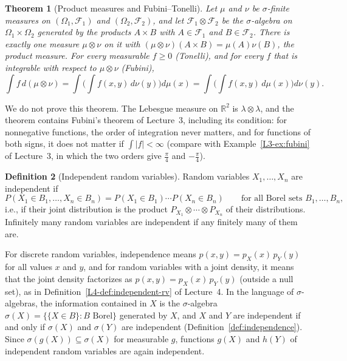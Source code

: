 \documentclass[11pt]{article}
\theoremstyle{definition}
\newtheorem{definition}{Definition}[section]
\theoremstyle{plain}
\newtheorem{theorem}[definition]{Theorem}
\theoremstyle{remark}
\begin{document}
\begin{theorem}[Product measures and Fubini--Tonelli]\label{thm:fubini-tonelli}
    Let $\mu$ and $\nu$ be $\sigma$-finite measures on $(\Omega_1, \mathcal{F}_1)$ and $(\Omega_2, \mathcal{F}_2)$, and let $\mathcal{F}_1 \otimes \mathcal{F}_2$ be the $\sigma$-algebra on $\Omega_1 \times \Omega_2$ generated by the products $A \times B$ with $A \in \mathcal{F}_1$ and $B \in \mathcal{F}_2$. There is exactly one measure $\mu \otimes \nu$ on it with $(\mu \otimes \nu)(A \times B) = \mu(A)\nu(B)$, the product measure. For every measurable $f \geq 0$ (Tonelli), and for every $f$ that is integrable with respect to $\mu \otimes \nu$ (Fubini),
    \[\int f\, d(\mu \otimes \nu) = \int\bigg(\int f(x, y)\, d\nu(y)\bigg) d\mu(x) = \int\bigg(\int f(x, y)\, d\mu(x)\bigg) d\nu(y).\]
\end{theorem}

We do not prove this theorem. The Lebesgue measure on $\mathbb{R}^2$ is $\lambda \otimes \lambda$, and the theorem contains Fubini's theorem of Lecture~3, including its condition: for nonnegative functions, the order of integration never matters, and for functions of both signs, it does not matter if $\int |f| < \infty$ (compare with Example~\ref{L3-ex:fubini} of Lecture~3, in which the two orders give $\frac{\pi}{4}$ and $-\frac{\pi}{4}$).

\begin{definition}[Independent random variables]\label{def:independent-rv}
    Random variables $X_1, \ldots, X_n$ are independent if
    \[P(X_1 \in B_1, \ldots, X_n \in B_n) = P(X_1 \in B_1)\cdots P(X_n \in B_n) \qquad \text{for all Borel sets } B_1, \ldots, B_n,\]
    i.e., if their joint distribution is the product $P_{X_1} \otimes \cdots \otimes P_{X_n}$ of their distributions. Infinitely many random variables are independent if any finitely many of them are.
\end{definition}

For discrete random variables, independence means $p(x, y) = p_X(x)\,p_Y(y)$ for all values $x$ and $y$, and for random variables with a joint density, it means that the joint density factorizes as $p(x, y) = p_X(x)\,p_Y(y)$ (outside a null set), as in Definition~\ref{L4-def:independent-rv} of Lecture~4. In the language of $\sigma$-algebras, the information contained in $X$ is the $\sigma$-algebra $\sigma(X) = \{\{X \in B\} : B \text{ Borel}\}$ generated by $X$, and $X$ and $Y$ are independent if and only if $\sigma(X)$ and $\sigma(Y)$ are independent (Definition~\ref{def:independence}). Since $\sigma(g(X)) \subseteq \sigma(X)$ for measurable $g$, functions $g(X)$ and $h(Y)$ of independent random variables are again independent.
\end{document}
